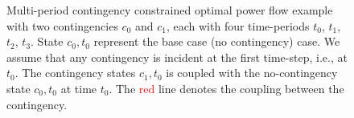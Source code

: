 \begin{figure}[h!]
\caption{Multi-period contingency constrained optimal power flow example with two contingencies $c_0$ and $c_1$, each with four time-periods $t_0$, $t_1$, $t_2$, $t_3$. State $c_0,t_0$ represent the base case (no contingency) case. We assume that any contingency is incident at the first time-step, i.e., at $t_0$. The contingency states $c_1,t_0$ is coupled with the no-contingency state $c_0,t_0$ at time $t_0$. The {\textcolor{red}{red}} line denotes the coupling between the contingency.}
\label{fig:ctopflow}
\end{figure}